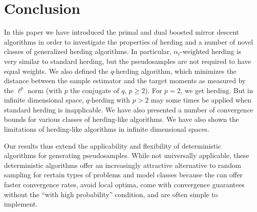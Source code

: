 \documentclass[paper.tex]{subfiles}
\begin{document}
\section{Conclusion} 
\label{sec:conclusion}

In this paper we have introduced the primal and dual boosted mirror descent algorithms in order to investigate the properties of herding and a number of novel classes of generalized herding algorithms. In particular, $\alpha_{t}$-weighted herding is very similar to standard herding, but the pseudosamples are not required to have equal weights. We also defined the $q$-herding algorithm, which minimizes the distance between the sample estimator and the target moments as measured by the $\ell^{p}$ norm (with $p$ the conjugate of $q$, $p \ge 2$). For $p = 2$, we get herding. But in infinite dimensional space, $q$-herding with $p > 2$ may some times be applied when standard herding is inapplicable. We have also presented a number of convergence bounds for various classes of herding-like algorithms. We have also shown the limitations of herding-like algorithms in infinite dimensional spaces. 



Our results thus extend the applicability and flexibility of deterministic algorithms for generating pseudosamples. While not universally applicable, these deterministic algorithms offer an increasingly attractive alternative to random sampling for certain types of problems and model classes because the can offer faster convergence rates, avoid local optima, come with convergence guarantees without the ``with high probability'' condition, and are often simple to implement. 
\end{document}
